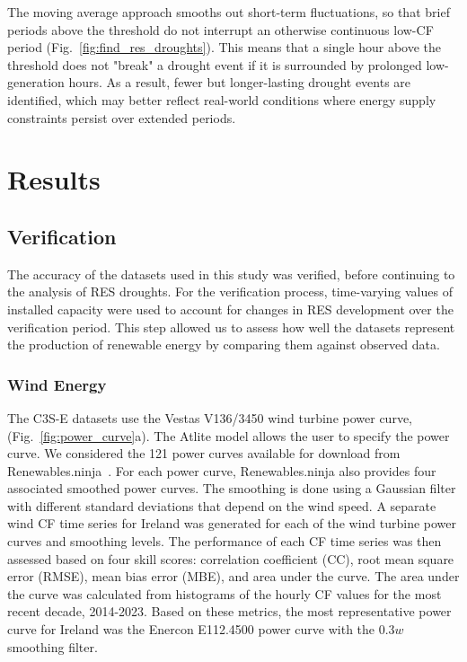\documentclass[preprint, 12pt]{elsarticle}
\begin{document}
The moving average approach smooths out short-term fluctuations, so that brief periods above the threshold do not interrupt an otherwise continuous low-CF period (Fig.~\ref{fig:find_res_droughts}). This means that a single hour above the threshold does not "break" a drought event if it is surrounded by prolonged low-generation hours. As a result, fewer but longer-lasting drought events are identified, which may better reflect real-world conditions where energy supply constraints persist over extended periods.

\section{Results}
\label{sec:Results}

\subsection{Verification}
\label{sec:verification}

The accuracy of the datasets used in this study was verified, before continuing to the analysis of RES droughts. For the verification process, time-varying values of installed capacity were used to account for changes in RES development over the verification period. This step allowed us to assess how well the datasets represent the production of renewable energy by comparing them against observed data.

\subsubsection{Wind Energy}
\label{sec:wind_verification}

The C3S-E datasets use the Vestas V136/3450 wind turbine power curve, (Fig.~\ref{fig:power_curve}a). The Atlite model allows the user to specify the power curve. We considered the 121 power curves available for download from Renewables.ninja~\citep{staffell2016wake}. For each power curve, Renewables.ninja also provides four associated smoothed power curves. The smoothing is done using a Gaussian filter with different standard deviations that depend on the wind speed. A separate wind CF time series for Ireland was generated for each of the wind turbine power curves and smoothing levels. The performance of each CF time series was then assessed based on four skill scores: correlation coefficient (CC), root mean square error (RMSE), mean bias error (MBE), and area under the curve. The area under the curve was calculated from histograms of the hourly CF values for the most recent decade, 2014-2023. Based on these metrics, the most representative power curve for Ireland was the Enercon E112.4500 power curve with the $0.3w$  smoothing filter.
\end{document}
